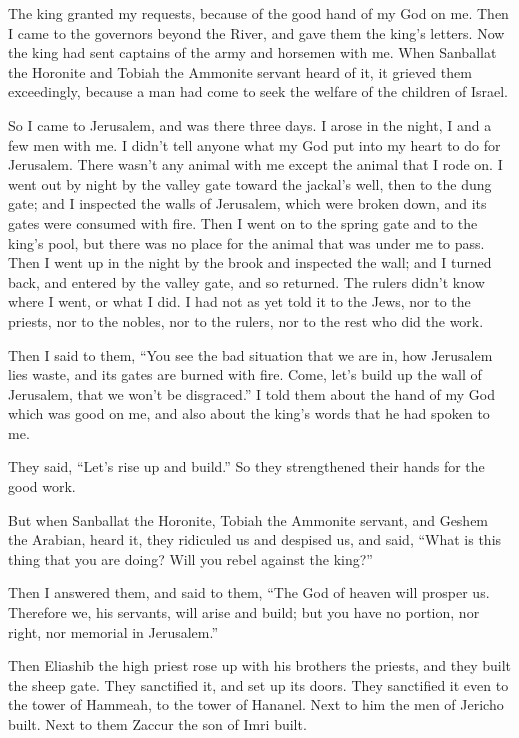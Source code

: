 The king granted my requests, because of the good hand of my God on me.
\myverse{}Then I came to the governors beyond the River, and gave them the king’s letters.
Now the king had sent captains of the army and horsemen with me.
\myverse{}When Sanballat the Horonite and Tobiah the Ammonite servant heard of it, it
grieved them exceedingly, because a man had come to seek the welfare of the children of Israel.

\myverse{}So I came to Jerusalem, and was there three days.
\myverse{}I arose in the night, I and a few men with me. I didn’t tell anyone what my
God put into my heart to do for Jerusalem. There wasn’t any animal with me except the animal that I rode
on.
\myverse{}I went out by night by the valley gate toward the jackal’s well, then to the
dung gate; and I inspected the walls of Jerusalem, which were broken down, and its gates were consumed
with fire.
\myverse{}Then I went on to the spring gate and to the king’s pool, but there was no
place for the animal that was under me to pass.
\myverse{}Then I went up in the night by the brook and inspected the wall; and I turned
back, and entered by the valley gate, and so returned.
\myverse{}The rulers didn’t know where I went, or what I did. I had not as yet told
it to the Jews, nor to the priests, nor to the nobles, nor to the rulers, nor to the rest who did the
work.

\myverse{}Then I said to them, “You see the bad situation that we are in,
how Jerusalem lies waste, and its gates are burned with fire. Come, let’s build up the wall of Jerusalem,
that we won’t be disgraced.”
\myverse{}I told them about the hand of my God which was good on me, and also about
the king’s words that he had spoken to me.

They said, “Let’s rise up and build.” So they strengthened their hands for the good work.

\myverse{}But when Sanballat the Horonite, Tobiah the Ammonite servant,
and Geshem the Arabian, heard it, they ridiculed us and despised us, and said, “What is this thing that
you are doing? Will you rebel against the king?”

\myverse{}Then I answered them, and said to them, “The God of heaven will
prosper us. Therefore we, his servants, will arise and build; but you have no portion, nor right, nor
memorial in Jerusalem.”


\mychapter{} \myverse*{}Then Eliashib the high priest rose up with his brothers the priests,
and they built the sheep gate. They sanctified it, and set up its doors. They sanctified it even to the
tower of Hammeah, to the tower of Hananel.
\myverse{}Next to him the men of Jericho built. Next to them Zaccur the son of Imri built.

